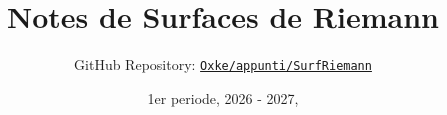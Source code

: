 

\title{Notes de Surfaces de Riemann}
\author{GitHub Repository:
\href{https://github.com/Oxke/appunti/tree/main/SurfRiemann}{\texttt{Oxke/appunti/SurfRiemann}}}

\date{1er periode, 2026 \-- 2027,}


\maketitle
\tableofcontents










